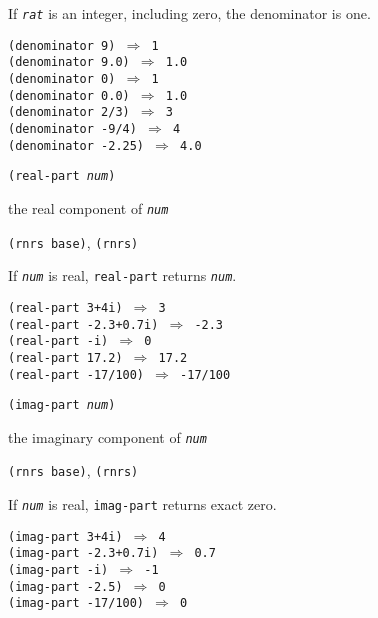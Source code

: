 If \texttt{\textit{rat}} is an integer, including zero, the denominator is one.


\begin{alltt}
(denominator 9) \(\Rightarrow\) 1
(denominator 9.0) \(\Rightarrow\) 1.0
(denominator 0) \(\Rightarrow\) 1
(denominator 0.0) \(\Rightarrow\) 1.0
(denominator 2/3) \(\Rightarrow\) 3
(denominator -9/4) \(\Rightarrow\) 4
(denominator -2.25) \(\Rightarrow\) 4.0
\end{alltt}

\begin{description}

\label{objects_s120}\item[procedure] \texttt{(real-part \textit{num})}



\item[returns] the real component of \texttt{\textit{num}}


\item[libraries] \texttt{(rnrs base)}, \texttt{(rnrs)}
\end{description}


If \texttt{\textit{num}} is real, \texttt{real-part} returns \texttt{\textit{num}}.


\begin{alltt}
(real-part 3+4i) \(\Rightarrow\) 3
(real-part -2.3+0.7i) \(\Rightarrow\) -2.3
(real-part -i) \(\Rightarrow\) 0
(real-part 17.2) \(\Rightarrow\) 17.2
(real-part -17/100) \(\Rightarrow\) -17/100
\end{alltt}

\begin{description}

\label{objects_s121}\item[procedure] \texttt{(imag-part \textit{num})}



\item[returns] the imaginary component of \texttt{\textit{num}}


\item[libraries] \texttt{(rnrs base)}, \texttt{(rnrs)}
\end{description}


If \texttt{\textit{num}} is real, \texttt{imag-part} returns exact zero.



\begin{alltt}
(imag-part 3+4i) \(\Rightarrow\) 4
(imag-part -2.3+0.7i) \(\Rightarrow\) 0.7
(imag-part -i) \(\Rightarrow\) -1
(imag-part -2.5) \(\Rightarrow\) 0
(imag-part -17/100) \(\Rightarrow\) 0
\end{alltt}

